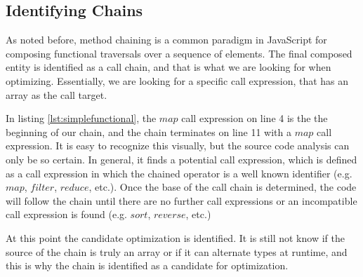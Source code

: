 \subsection{Identifying Chains}

As noted before, method chaining is a common paradigm in JavaScript for composing functional traversals over a sequence of elements.  The final composed entity is identified as a call chain, and that is what we are looking for when optimizing.  Essentially, we are looking for a specific call expression, that has an array as the call target. \\

\begin{minipage}{\linewidth}

\end{minipage}

In listing \ref{lst:simplefunctional}, the $map$ call expression on line 4 is the the beginning of our chain, and the chain terminates on line 11 with a $map$ call expression.  It is easy to recognize this visually, but the source code analysis can only be so certain.  In general, it finds a potential call expression, which is defined as a call expression in which the chained operator is a well known identifier (e.g. $map$, $filter$, $reduce$, etc.). Once the base of the call chain is determined, the code will follow the chain until there are no further call expressions or an incompatible call expression is found (e.g. $sort$, $reverse$, etc.)

At this point the candidate optimization is identified.  It is still not know if the source of the chain is truly an array or if it can alternate types at runtime, and this is why the chain is identified as a candidate for optimization. 